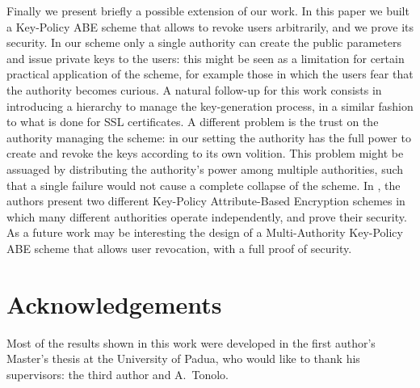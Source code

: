 \documentclass[a4paper,10pt]{article}
\begin{document}
	
Finally we present briefly a possible extension of our work. In this paper we built a Key-Policy ABE scheme that allows to revoke users arbitrarily, and we prove its security. In our scheme only a single authority can create the public parameters and issue private keys to the users: this might be seen as a limitation for certain practical application of the scheme, for example those in which the users fear that the authority becomes curious. A natural follow-up for this work consists in introducing a hierarchy to manage the key-generation process, in a similar fashion to what is done for SSL certificates. A different problem is the trust on the authority managing the scheme: in our setting the authority has the full power to create and revoke the keys according to its own volition. This problem might be assuaged by distributing the authority's power among multiple authorities, such that a single failure would not cause a complete collapse of the scheme. In \cite{longocollaborative,longo2015key}, the authors present two different Key-Policy Attribute-Based Encryption schemes in which many different authorities operate independently, and prove their security. As a future work may be interesting the design of a Multi-Authority Key-Policy ABE scheme that allows user revocation, with a full proof of security.
	
	
	
	
	


	\section*{Acknowledgements}
	Most of the results shown in this work were developed in the first author's Master's thesis at the University of Padua, who would like to thank his supervisors: the third author and A.~Tonolo.



	\printbibliography{}
\end{document}
